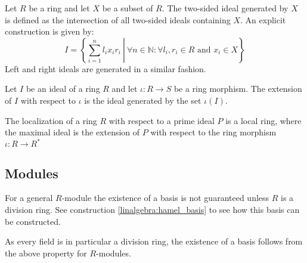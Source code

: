 	\begin{construct}\label{group:generating_set_ideal}
		Let $R$ be a ring and let $X$ be a subset of $R$. The two-sided ideal generated by $X$ is defined as the intersection of all two-sided ideals containing $X$. An explicit construction is given by:
		\begin{equation}
			I = \left\{\left.\sum_{i=1}^n l_ix_ir_i\ \right\vert\ \forall n\in\mathbb{N}:\forall l_i, r_i\in R\text{ and } x_i\in X\right\}
		\end{equation}
		Left and right ideals are generated in a similar fashion.
	\end{construct}
	\begin{construct}[Extension]
        	Let $I$ be an ideal of a ring $R$ and let $\iota:R\rightarrow S$ be a ring morphism. The extension of $I$ with respect to $\iota$ is the ideal generated by the set $\iota(I)$.
        \end{construct}
	
	\begin{property}
		The localization of a ring $R$ with respect to a prime ideal $P$ is a local ring, where the maximal ideal is the extension of $P$ with respect to the ring morphism $\iota:R\rightarrow R^*$
	\end{property}
	

\subsection{Modules}
	
	
	\begin{property}\label{algebra:module_basis}
		For a general $R$-module the existence of a basis is not guaranteed unless $R$ is a division ring. See construction \ref{linalgebra:hamel_basis} to see how this basis can be constructed.
	\end{property}
	\begin{result}
		As every field is in particular a division ring, the existence of a basis follows from the above property for $R$-modules.
	\end{result}
	
